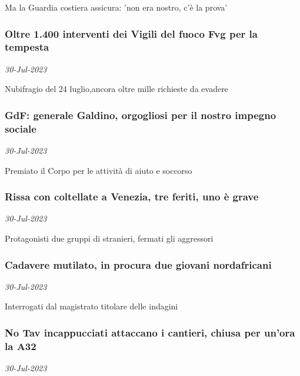 Ma la Guardia costiera assicura: 'non era nostro, c'\`{e} la prova'
\subsubsection{Oltre 1.400 interventi dei Vigili del fuoco Fvg per la tempesta \href{https://www.ansa.it/sito/notizie/cronaca/2023/07/30/oltre-1.400-interventi-dei-vigili-del-fuoco-fvg-per-la-tempesta_c626bf80-6456-44d7-836a-3f3e9f2b9ebe.html}{}}
\textit{30-Jul-2023}

Nubifragio del 24 luglio,ancora oltre mille richieste da evadere
\subsubsection{GdF: generale Galdino, orgogliosi per il nostro impegno sociale \href{https://www.ansa.it/sito/notizie/cronaca/2023/07/30/gdf-generale-galdino-orgogliosi-per-il-nostro-impegno-sociale_136e7d89-63ca-4456-8b93-fee1bbba740b.html}{}}
\textit{30-Jul-2023}

Premiato il Corpo per le attivit\`{a} di aiuto e soccorso
\subsubsection{Rissa con coltellate a Venezia, tre feriti, uno \`{e} grave \href{https://www.ansa.it/sito/notizie/cronaca/2023/07/30/rissa-con-coltellate-a-venezia-tre-feriti-uno-e-grave_92d9d0fa-4ab8-4877-9b8b-8df12907eeec.html}{}}
\textit{30-Jul-2023}

Protagonisti due gruppi di stranieri, fermati gli aggressori
\subsubsection{Cadavere mutilato, in procura due giovani nordafricani \href{https://www.ansa.it/sito/notizie/cronaca/2023/07/30/cadavere-mutilato-in-procura-due-giovani-nordafricani_613b4673-e125-4dfd-be27-82dd4648296f.html}{}}
\textit{30-Jul-2023}

Interrogati dal magistrato titolare delle indagini
\subsubsection{No Tav incappucciati attaccano i cantieri, chiusa per un'ora la A32 \href{https://www.ansa.it/sito/notizie/cronaca/2023/07/30/no-tav-incappucciati-attaccano-i-cantieri-chiusa-per-unora-la-a32_7feefe36-7221-4ee6-8c1d-9b5fba3c2bd8.html}{}}
\textit{30-Jul-2023}

